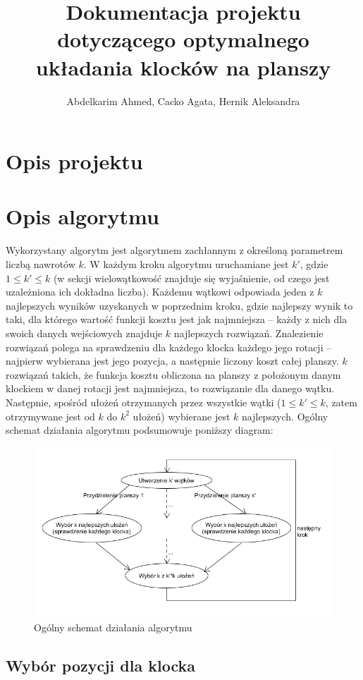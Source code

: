 \documentclass{article}
\title{Dokumentacja projektu dotyczącego optymalnego układania klocków na planszy}
\author{Abdelkarim Ahmed, Cacko Agata, Hernik Aleksandra}
\begin{document}
\maketitle
\section{Opis projektu}

\clearpage
\section{Opis algorytmu}
Wykorzystany algorytm jest algorytmem zachłannym z określoną parametrem liczbą nawrotów $k$. W każdym kroku algorytmu uruchamiane jest $k'$, gdzie $1 \le k' \le k$ (w sekcji wielowątkowość znajduje się wyjaśnienie, od czego jest uzależniona ich dokładna liczba). Każdemu wątkowi odpowiada jeden z $k$ najlepszych wyników uzyskanych w poprzednim kroku, gdzie najlepszy wynik to taki, dla którego wartość funkcji kosztu jest jak najmniejsza -- każdy z nich dla swoich danych wejściowych znajduje $k$ najlepszych rozwiązań. Znalezienie rozwiązań polega na sprawdzeniu dla każdego klocka każdego jego rotacji -- najpierw wybierana jest jego pozycja, a następnie liczony koszt całej planszy. $k$ rozwiązań takich, że funkcja kosztu obliczona na planszy z położonym danym klockiem w danej rotacji jest najmniejsza, to rozwiązanie dla danego wątku. Następnie, spośród ułożeń otrzymanych przez wszystkie wątki ($1 \le k' \le k$, zatem otrzymywane jest od $k$ do $k^2$ ułożeń) wybierane jest $k$ najlepszych. Ogólny schemat działania algorytmu podsumowuje poniższy diagram:
\begin{figure}[H]
\includegraphics[width=\textwidth]{schemat_algorytmu.png}
\caption{Ogólny schemat działania algorytmu}
\end{figure}
\subsection{Wybór pozycji dla klocka}
\end{document}
